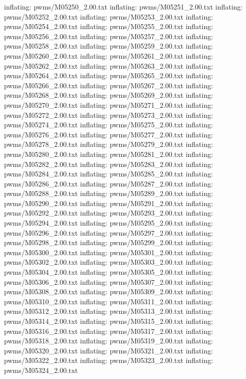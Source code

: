 \documentclass[letterpaper,10pt,english]{sphinxmanual}
\begin{document}
{\begin{sphinxVerbatim}[commandchars=\\\{\}]
  inflating: pwms/M05250\_2.00.txt
  inflating: pwms/M05251\_2.00.txt
  inflating: pwms/M05252\_2.00.txt
  inflating: pwms/M05253\_2.00.txt
  inflating: pwms/M05254\_2.00.txt
  inflating: pwms/M05255\_2.00.txt
  inflating: pwms/M05256\_2.00.txt
  inflating: pwms/M05257\_2.00.txt
  inflating: pwms/M05258\_2.00.txt
  inflating: pwms/M05259\_2.00.txt
  inflating: pwms/M05260\_2.00.txt
  inflating: pwms/M05261\_2.00.txt
  inflating: pwms/M05262\_2.00.txt
  inflating: pwms/M05263\_2.00.txt
  inflating: pwms/M05264\_2.00.txt
  inflating: pwms/M05265\_2.00.txt
  inflating: pwms/M05266\_2.00.txt
  inflating: pwms/M05267\_2.00.txt
  inflating: pwms/M05268\_2.00.txt
  inflating: pwms/M05269\_2.00.txt
  inflating: pwms/M05270\_2.00.txt
  inflating: pwms/M05271\_2.00.txt
  inflating: pwms/M05272\_2.00.txt
  inflating: pwms/M05273\_2.00.txt
  inflating: pwms/M05274\_2.00.txt
  inflating: pwms/M05275\_2.00.txt
  inflating: pwms/M05276\_2.00.txt
  inflating: pwms/M05277\_2.00.txt
  inflating: pwms/M05278\_2.00.txt
  inflating: pwms/M05279\_2.00.txt
  inflating: pwms/M05280\_2.00.txt
  inflating: pwms/M05281\_2.00.txt
  inflating: pwms/M05282\_2.00.txt
  inflating: pwms/M05283\_2.00.txt
  inflating: pwms/M05284\_2.00.txt
  inflating: pwms/M05285\_2.00.txt
  inflating: pwms/M05286\_2.00.txt
  inflating: pwms/M05287\_2.00.txt
  inflating: pwms/M05288\_2.00.txt
  inflating: pwms/M05289\_2.00.txt
  inflating: pwms/M05290\_2.00.txt
  inflating: pwms/M05291\_2.00.txt
  inflating: pwms/M05292\_2.00.txt
  inflating: pwms/M05293\_2.00.txt
  inflating: pwms/M05294\_2.00.txt
  inflating: pwms/M05295\_2.00.txt
  inflating: pwms/M05296\_2.00.txt
  inflating: pwms/M05297\_2.00.txt
  inflating: pwms/M05298\_2.00.txt
  inflating: pwms/M05299\_2.00.txt
  inflating: pwms/M05300\_2.00.txt
  inflating: pwms/M05301\_2.00.txt
  inflating: pwms/M05302\_2.00.txt
  inflating: pwms/M05303\_2.00.txt
  inflating: pwms/M05304\_2.00.txt
  inflating: pwms/M05305\_2.00.txt
  inflating: pwms/M05306\_2.00.txt
  inflating: pwms/M05307\_2.00.txt
  inflating: pwms/M05308\_2.00.txt
  inflating: pwms/M05309\_2.00.txt
  inflating: pwms/M05310\_2.00.txt
  inflating: pwms/M05311\_2.00.txt
  inflating: pwms/M05312\_2.00.txt
  inflating: pwms/M05313\_2.00.txt
  inflating: pwms/M05314\_2.00.txt
  inflating: pwms/M05315\_2.00.txt
  inflating: pwms/M05316\_2.00.txt
  inflating: pwms/M05317\_2.00.txt
  inflating: pwms/M05318\_2.00.txt
  inflating: pwms/M05319\_2.00.txt
  inflating: pwms/M05320\_2.00.txt
  inflating: pwms/M05321\_2.00.txt
  inflating: pwms/M05322\_2.00.txt
  inflating: pwms/M05323\_2.00.txt
  inflating: pwms/M05324\_2.00.txt

\end{sphinxVerbatim}}
\end{document}
